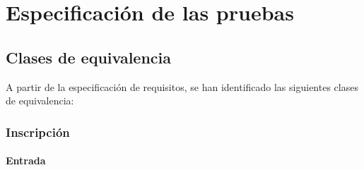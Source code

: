 \chapter{Especificación de las pruebas}

\section{Clases de equivalencia}
A partir de la especificación de requisitos, se han identificado las siguientes clases de equivalencia:

\subsection{Inscripción}
\subsubsection{Entrada}
